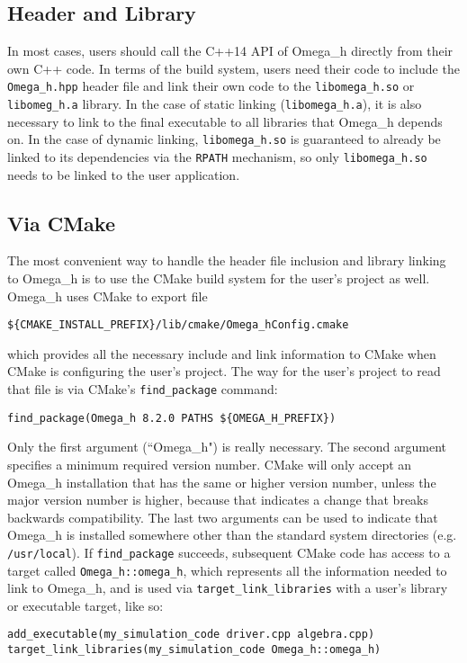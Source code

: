 \documentclass{article}
\begin{document}
\subsection{Header and Library}

In most cases, users should call the C++14 API of Omega\_h directly
from their own C++ code.
In terms of the build system, users need their code to include
the \texttt{Omega\_h.hpp} header file and link their own code
to the \texttt{libomega\_h.so} or \texttt{libomeg\_h.a} library.
In the case of static linking (\texttt{libomega\_h.a}), it is
also necessary to link to the final executable to all libraries
that Omega\_h depends on.
In the case of dynamic linking, \texttt{libomega\_h.so} is guaranteed
to already be linked to its dependencies via the \texttt{RPATH}
mechanism, so only \texttt{libomega\_h.so} needs to be linked
to the user application.

\subsection{Via CMake}

The most convenient way to handle the header file inclusion
and library linking to Omega\_h is to use the CMake build system
for the user's project as well.
Omega\_h uses CMake to export file

\texttt{\$\{CMAKE\_INSTALL\_PREFIX\}/lib/cmake/Omega\_hConfig.cmake}

which provides all the necessary include and link information
to CMake when CMake is configuring the user's project.
The way for the user's project to read that file is via
CMake's \texttt{find\_package} command:

\begin{lstlisting}
find_package(Omega_h 8.2.0 PATHS ${OMEGA_H_PREFIX})
\end{lstlisting}

Only the first argument (``Omega\_h") is really necessary.
The second argument specifies a minimum required version number.
CMake will only accept an Omega\_h installation that has
the same or higher version number, unless the major version number
is higher, because that indicates a change that breaks backwards
compatibility.
The last two arguments can be used to indicate that Omega\_h
is installed somewhere other than the standard system directories
(e.g. \texttt{/usr/local}).
If \texttt{find\_package} succeeds, subsequent CMake code has
access to a target called \texttt{Omega\_h::omega\_h}, which
represents all the information needed to link to Omega\_h,
and is used via \texttt{target\_link\_libraries} with a user's
library or executable target, like so:
\begin{lstlisting}
add_executable(my_simulation_code driver.cpp algebra.cpp)
target_link_libraries(my_simulation_code Omega_h::omega_h)
\end{lstlisting}
\end{document}
